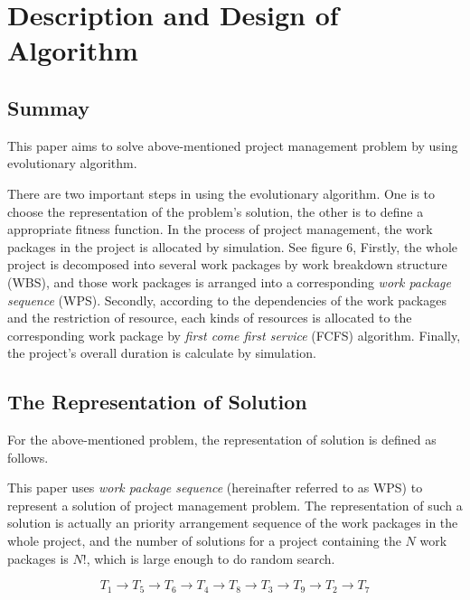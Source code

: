 %
%

\section{Description and Design of Algorithm}

\subsection{Summay}
%
This paper aims to solve above-mentioned project management problem by using
evolutionary algorithm.


There are two important steps in using the evolutionary algorithm. One is to
choose the representation of the problem's solution, the other is to define a
appropriate fitness function. In the process of project management, the work
packages in the project is allocated by simulation. See figure 6, Firstly, the
whole project is decomposed into several work packages by work breakdown
structure (WBS), and those work packages is arranged into a corresponding
\emph{work package sequence} (WPS). Secondly, according to the dependencies of
the work packages and the restriction of resource, each kinds of resources is
allocated to the corresponding work package by \emph{first come first service}
(FCFS) algorithm. Finally, the project's overall duration is calculate by
simulation.


\subsection{The Representation of Solution}
%
For the above-mentioned problem, the representation of solution is defined as
follows.


This paper uses \emph{work package sequence} (hereinafter referred to as WPS) to
represent a solution of project management problem. The representation of such a
solution is actually an priority arrangement sequence of the work packages in
the whole project, and the number of solutions for a project containing the $N$
work packages is $N!$, which is large enough to do random search.

\begin{equation}
  T_1 \rightarrow T_5 \rightarrow T_6 \rightarrow T_4 \rightarrow T_8
  \rightarrow T_3 \rightarrow T_9 \rightarrow T_2 \rightarrow T_7
  \label{repr}
\end{equation}

